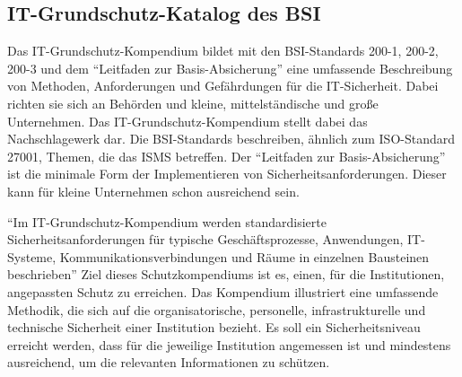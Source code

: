 \subsection{IT-Grundschutz-Katalog des \ac{BSI}}
Das IT-Grundschutz-Kompendium bildet mit den BSI-Standards 200-1, 200-2, 200-3 und dem \enquote{Leitfaden zur Basis-Absicherung} eine umfassende Beschreibung von Methoden, Anforderungen und Gefährdungen für die IT-Sicherheit. Dabei richten sie sich an Behörden und kleine, mittelständische und große Unternehmen.\autocite[vgl.][S.3]{bundesamt_fur_sicherheit_in_der_informationstechnik_bsi_it-grundschutz-kompendium_2020} Das IT-Grundschutz-Kompendium stellt dabei das Nachschlagewerk dar. Die BSI-Standards beschreiben, ähnlich zum ISO-Standard 27001, Themen, die das \ac{ISMS} betreffen. Der \enquote{Leitfaden zur Basis-Absicherung} ist die minimale Form der Implementieren von Sicherheitsanforderungen. Dieser kann für kleine Unternehmen schon ausreichend sein.\autocite[vgl.][S.5]{bundesamt_fur_sicherheit_in_der_informationstechnik_bsi_leitfaden_2017}
\par
\enquote{Im IT-Grundschutz-Kompendium werden standardisierte Sicherheitsanforderungen für typische Geschäftsprozesse, Anwendungen, IT-Systeme, Kommunikationsverbindungen und Räume in einzelnen Bausteinen beschrieben}\autocite[][S.2]{bundesamt_fur_sicherheit_in_der_informationstechnik_bsi_it-grundschutz-kompendium_2020} Ziel dieses Schutzkompendiums ist es, einen, für die Institutionen, angepassten Schutz zu erreichen. Das Kompendium illustriert eine umfassende Methodik, die sich auf die organisatorische, personelle, infrastrukturelle und technische Sicherheit einer Institution bezieht. Es soll ein Sicherheitsniveau erreicht werden, dass für die jeweilige Institution angemessen ist und mindestens ausreichend, um die relevanten Informationen zu schützen. 

